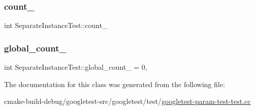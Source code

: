 \subsubsection{\texorpdfstring{count\_}{count\_}}
{\footnotesize\ttfamily int Separate\+Instance\+Test\+::count\+\_\+\hspace{0.3cm}{\ttfamily [protected]}}

\mbox{\label{classSeparateInstanceTest_a79db6d4cdd6c99b256439cc020f782ef}} 
\subsubsection{\texorpdfstring{global\_count\_}{global\_count\_}}
{\footnotesize\ttfamily int Separate\+Instance\+Test\+::global\+\_\+count\+\_\+ = 0\hspace{0.3cm}{\ttfamily [static]}, {\ttfamily [protected]}}



The documentation for this class was generated from the following file\+:\begin{DoxyCompactItemize}
\item 
cmake-\/build-\/debug/googletest-\/src/googletest/test/\mbox{\hyperlink{googletest-param-test-test_8cc}{googletest-\/param-\/test-\/test.\+cc}}\end{DoxyCompactItemize}
